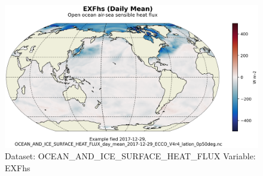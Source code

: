 \begin{figure}[H]
\centering
\includegraphics[scale=0.55]{../images/plots/latlon_plots/Ocean_and_Sea-Ice_Surface_Heat_Fluxes/EXFhs.png}
\caption{Dataset: OCEAN\_AND\_ICE\_SURFACE\_HEAT\_FLUX Variable: EXFhs}
\label{tab:table-OCEAN_AND_ICE_SURFACE_HEAT_FLUX_EXFhs-Plot}
\end{figure}
\pagebreak

